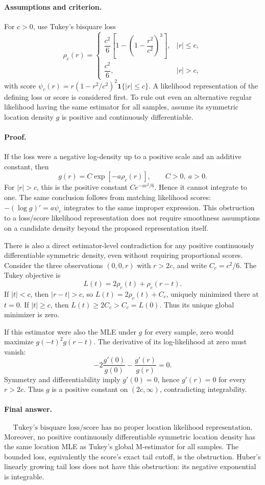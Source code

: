\documentclass[answers,12pt,addpoints]{exam}
\providecommand{\ind}{\mathbf{1}}
\begin{document}
\begin{questions}
\begin{solution}
\paragraph{Assumptions and criterion.}
For $c>0$, use Tukey's bisquare loss
\[
\rho_c(r)=\begin{cases}
\dfrac{c^2}{6}\left[1-\left(1-\dfrac{r^2}{c^2}\right)^3\right],
&|r|\leq c,\\[1ex]
\dfrac{c^2}{6},&|r|>c,
\end{cases}
\]
with score $\psi_c(r)=r(1-r^2/c^2)^2\ind\{|r|\leq c\}$.
A likelihood representation of the defining loss or score is
considered first. To rule out even an alternative regular likelihood
having the same estimator for all samples, assume its symmetric
location density $g$ is positive and continuously differentiable.

\paragraph{Proof.}
If the loss were a negative log-density up to a positive scale and
an additive constant, then
\[
g(r)=C\exp[-a\rho_c(r)],\qquad C>0,\ a>0.
\]
For $|r|>c$, this is the positive constant $Ce^{-ac^2/6}$.
Hence it cannot integrate to one. The same conclusion follows from
matching likelihood scores: $-(\log g)'=a\psi_c$ integrates to the
same improper expression. This obstruction to a loss/score likelihood
representation does not require smoothness assumptions on a candidate
density beyond the proposed representation itself.

There is also a direct estimator-level contradiction for any positive
continuously differentiable symmetric density, even without requiring
proportional scores. Consider the three observations $(0,0,r)$ with
$r>2c$, and write $C_c=c^2/6$. The Tukey objective is
\[
L(t)=2\rho_c(t)+\rho_c(r-t).
\]
If $|t|<c$, then $|r-t|>c$, so $L(t)=2\rho_c(t)+C_c$, uniquely
minimized there at $t=0$. If $|t|\geq c$, then
$L(t)\geq2C_c>C_c=L(0)$. Thus its unique global minimizer is zero.

If this estimator were also the MLE under $g$ for every sample,
zero would maximize $g(-t)^2g(r-t)$. The derivative of its
log-likelihood at zero must vanish:
\[
-2\frac{g'(0)}{g(0)}-\frac{g'(r)}{g(r)}=0.
\]
Symmetry and differentiability imply $g'(0)=0$, hence $g'(r)=0$
for every $r>2c$. Thus $g$ is a positive constant on $(2c,\infty)$,
contradicting integrability.

\paragraph{Final answer.}
\[
\boxed{\text{Tukey's bisquare loss/score has no proper
location likelihood representation.}}
\]
Moreover, no positive continuously differentiable symmetric location
density has the same location MLE as Tukey's global M-estimator for
all samples. The bounded loss, equivalently the score's exact tail
cutoff, is the obstruction. Huber's linearly growing tail loss does
not have this obstruction: its negative exponential is integrable.
\end{solution}


\end{questions}
\end{document}
